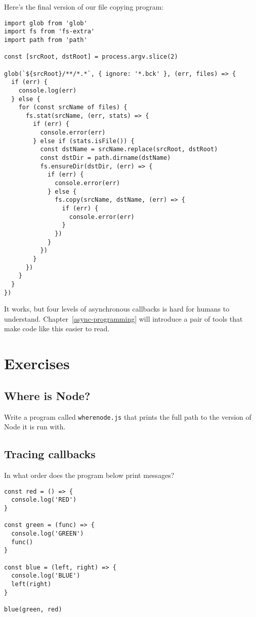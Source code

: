 \documentclass[krantzl]{krantz}
\newcommand{\chapref}[1]{Chapter~\ref{#1}}
\begin{document}
Here’s the final version of our file copying program:


\begin{lstlisting}[frame=tblr]
import glob from 'glob'
import fs from 'fs-extra'
import path from 'path'

const [srcRoot, dstRoot] = process.argv.slice(2)

glob(`${srcRoot}/**/*.*`, { ignore: '*.bck' }, (err, files) => {
  if (err) {
    console.log(err)
  } else {
    for (const srcName of files) {
      fs.stat(srcName, (err, stats) => {
        if (err) {
          console.error(err)
        } else if (stats.isFile()) {
          const dstName = srcName.replace(srcRoot, dstRoot)
          const dstDir = path.dirname(dstName)
          fs.ensureDir(dstDir, (err) => {
            if (err) {
              console.error(err)
            } else {
              fs.copy(srcName, dstName, (err) => {
                if (err) {
                  console.error(err)
                }
              })
            }
          })
        }
      })
    }
  }
})
\end{lstlisting}



\noindent It works,
but four levels of asynchronous callbacks is hard for humans to understand.
\chapref{async-programming} will introduce a pair of tools
that make code like this easier to read.

\section{Exercises}\label{systems-programming-exercises}

\subsection*{Where is Node?}


Write a program called \texttt{wherenode.js} that prints the full path to the version of Node it is run with.

\subsection*{Tracing callbacks}


In what order does the program below print messages?


\begin{lstlisting}[frame=tblr]
const red = () => {
  console.log('RED')
}

const green = (func) => {
  console.log('GREEN')
  func()
}

const blue = (left, right) => {
  console.log('BLUE')
  left(right)
}

blue(green, red)
\end{lstlisting}
\end{document}
